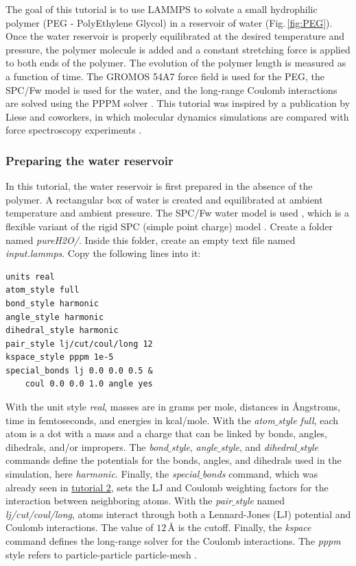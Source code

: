 \documentclass[9pt,tutorial]{livecoms}
\begin{document}
\noindent The goal of this tutorial is to use LAMMPS to solvate a small hydrophilic polymer (PEG - PolyEthylene Glycol) in a reservoir of water (Fig.\,\ref{fig:PEG}). Once the water reservoir is properly equilibrated at the desired temperature and pressure, the polymer molecule is added and a constant stretching force is applied to both ends of the polymer. The evolution of the polymer length is measured as a function of time. The GROMOS 54A7 force field \cite{schmid2011definition} is used for the PEG, the SPC/Fw model \cite{wu2006flexible} is used for the water, and the long-range Coulomb interactions are solved using the PPPM solver \cite{luty1996calculating}. This tutorial was inspired by a publication by Liese and coworkers, in which molecular dynamics simulations are compared with force spectroscopy experiments \cite{liese2017hydration}.

\subsubsection{Preparing the water reservoir}

In this tutorial, the water reservoir is first prepared in the absence of the polymer. A rectangular box of water is created and equilibrated at ambient temperature and ambient pressure. The SPC/Fw water model is used \cite{wu2006flexible}, which is
a flexible variant of the rigid SPC (simple point charge) model \cite{berendsen1981interaction}. Create a folder named \textit{pureH2O/}. Inside this folder, create an empty text file named \textit{input.lammps}. Copy the following lines into it:
{\normalsize \begin{verbatim}
units real
atom_style full
bond_style harmonic
angle_style harmonic
dihedral_style harmonic
pair_style lj/cut/coul/long 12
kspace_style pppm 1e-5
special_bonds lj 0.0 0.0 0.5 &
    coul 0.0 0.0 1.0 angle yes
\end{verbatim}}
With the unit style \textit{real}, masses are in grams per mole, distances in Ångstroms, time in femtoseconds, and energies
in kcal/mole. With the \textit{atom$\_$style full}, each atom is a dot with a mass and a charge that can be linked by bonds, angles, dihedrals, and/or impropers. The \textit{bond$\_$style}, \textit{angle$\_$style}, and \textit{dihedral$\_$style} commands define the potentials for the bonds, angles, and dihedrals used in the simulation, here \textit{harmonic}. Finally, the \textit{special$\_$bonds} command, which was already seen in \hyperref[carbon-nanotube-label]{tutorial 2}, sets the LJ and Coulomb weighting factors for the interaction between neighboring atoms. With the \textit{pair$\_$style} named \textit{lj/cut/coul/long}, atoms interact through both a Lennard-Jones (LJ) potential and Coulomb interactions. The value of $12\,\text{\AA{}}$ is the cutoff. Finally, the \textit{kspace} command defines the long-range solver for the Coulomb interactions. The \textit{pppm} style refers to particle-particle particle-mesh \cite{luty1996calculating}.
\end{document}
